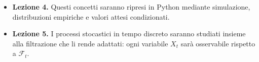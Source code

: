 \documentclass[handout]{beamer}%
\newenvironment{stepitemize}{\begin{itemize}[<+->]}{\end{itemize} }
\providecommand{\1}{\mathbf{1}}
\begin{document}
\begin{frame}
\begin{stepitemize}
\item \textbf{Lezione 4.} Questi concetti saranno ripresi in Python mediante simulazione, distribuzioni empiriche e valori attesi condizionati.

\item \textbf{Lezione 5.} I processi stocastici in tempo discreto saranno studiati insieme alla filtrazione che li rende adattati: ogni variabile $X_t$ sar\`{a} osservabile rispetto a $\mathcal{F}_t$.
 
\end{stepitemize}
 
\transboxout
\end{frame}%







\end{document}
